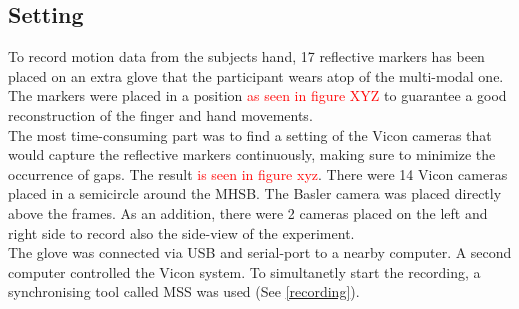 \subsection{Setting}
To record motion data from the subjects hand, 17 reflective markers has been placed on an extra glove that the participant wears atop of the multi-modal one. The markers were placed in a position \textcolor{red}{as seen in figure XYZ} to guarantee a good reconstruction of the finger and hand movements.\\
The most time-consuming part was to find a setting of the Vicon cameras that would capture the reflective markers continuously, making sure to minimize the occurrence of gaps. The result \textcolor{red}{is seen in figure xyz}. There were 14 Vicon cameras placed in a semicircle around the MHSB. The Basler camera was placed directly above the frames. As an addition, there were 2 cameras placed on the left and right side to record also the side-view of the experiment.\\
The glove was connected via USB and serial-port to a nearby computer. A second computer controlled the Vicon system. To simultanetly start the recording, a synchronising tool called MSS was used (See \ref{recording}).


 